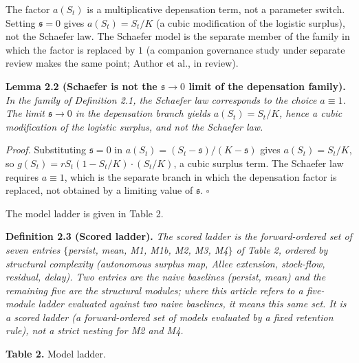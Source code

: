 \documentclass[11pt]{article}
\begin{document}
The factor \(a(S_t)\) is a multiplicative depensation term, not a
parameter switch. Setting \(\mathfrak s=0\) gives \(a(S_t)=S_t/K\) (a
cubic modification of the logistic surplus), not the Schaefer law. The
Schaefer model is the separate member of the family in which the factor
is replaced by \(1\) (a companion governance study under separate review
makes the same point; Author et al., in review).

\textbf{Lemma 2.2 (Schaefer is not the \(\mathfrak s\to 0\) limit of the
depensation family).} \emph{In the family of Definition 2.1, the
Schaefer law corresponds to the choice \(a\equiv 1\). The limit
\(\mathfrak s\to 0\) in the depensation branch yields \(a(S_t)=S_t/K\),
hence a cubic modification of the logistic surplus, and not the Schaefer
law.}

\emph{Proof.} Substituting \(\mathfrak s=0\) in
\(a(S_t)=(S_t-\mathfrak s)/(K-\mathfrak s)\) gives \(a(S_t)=S_t/K\), so
\(g(S_t)=rS_t(1-S_t/K)\cdot(S_t/K)\), a cubic surplus term. The Schaefer
law requires \(a\equiv 1\), which is the separate branch in which the
depensation factor is replaced, not obtained by a limiting value of
\(\mathfrak s\). \ensuremath{\square}

The model ladder is given in Table 2.

\textbf{Definition 2.3 (Scored ladder).} \emph{The scored ladder is the
forward-ordered set of seven entries \(\{\)persist, mean, M1, M1b, M2,
M3, M4\(\}\) of Table 2, ordered by structural complexity (autonomous
surplus map, Allee extension, stock-flow, residual, delay). Two entries
are the naive baselines (persist, mean) and the remaining five are the
structural modules; where this article refers to a five-module ladder
evaluated against two naive baselines, it means this same set. It is a
scored ladder (a forward-ordered set of models evaluated by a fixed
retention rule), not a strict nesting for M2 and M4.}

\textbf{Table 2.} Model ladder.
\end{document}
